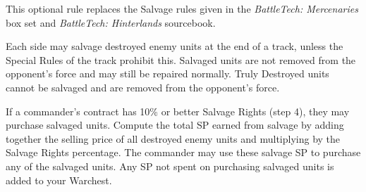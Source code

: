 This optional rule replaces the Salvage rules given in the \emph{BattleTech: Mercenaries} box set and \emph{BattleTech: Hinterlands} sourcebook.

Each side may salvage destroyed enemy units at the end of a track, unless the Special Rules of the track prohibit this.
Salvaged units are not removed from the opponent's force and may still be repaired normally.
Truly Destroyed units cannot be salvaged and are removed from the opponent's force.

If a commander's contract has 10\% or better Salvage Rights (step 4), they may purchase salvaged units.
Compute the total SP earned from salvage by adding together the selling price of all destroyed enemy units and multiplying by the Salvage Rights percentage.
The commander may use these salvage SP to purchase any of the salvaged units.
Any SP not spent on purchasing salvaged units is added to your Warchest.
